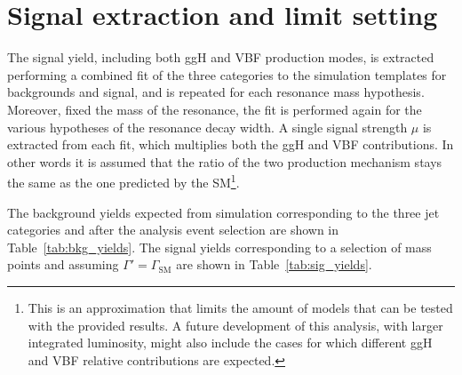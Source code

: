 \section{Signal extraction and limit setting}\label{chap6:SignalExtractionAndLimits}

The signal yield, including both ggH and VBF production modes, is extracted performing a combined fit of the three categories to the \mti simulation templates for backgrounds and signal, and is repeated for each resonance mass hypothesis. Moreover, fixed the mass of the resonance, the fit is performed again for the various hypotheses of the resonance decay width. A single signal strength $\mu$ is extracted from each fit, which multiplies both the ggH and VBF contributions. In other words it is assumed that the ratio of the two production mechanism stays the same as the one predicted by the SM\footnote{This is an approximation that limits the amount of models that can be tested with the provided results. A future development of this analysis, with larger integrated luminosity, might also include the cases for which different ggH and VBF relative contributions are expected.}.

The background yields expected from simulation corresponding to the three jet categories and after the analysis event selection are shown in Table~\ref{tab:bkg_yields}. The signal yields corresponding to a selection of mass points and assuming $\Gamma' = \Gamma_\mathrm{SM}$ are shown in Table~\ref{tab:sig_yields}.

